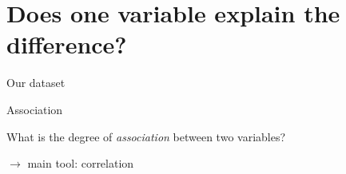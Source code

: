 \documentclass[compress]{beamer}
\begin{document}
\section{Does one variable explain the difference?}

\begin{frame}{Our dataset}

    \centering

\end{frame}

\begin{frame}{Association}

    \Large
    \centering
    \bf

    What is the degree of \emph{association} between two variables?

    $\rightarrow$ main tool: correlation

\end{frame}
\end{document}
